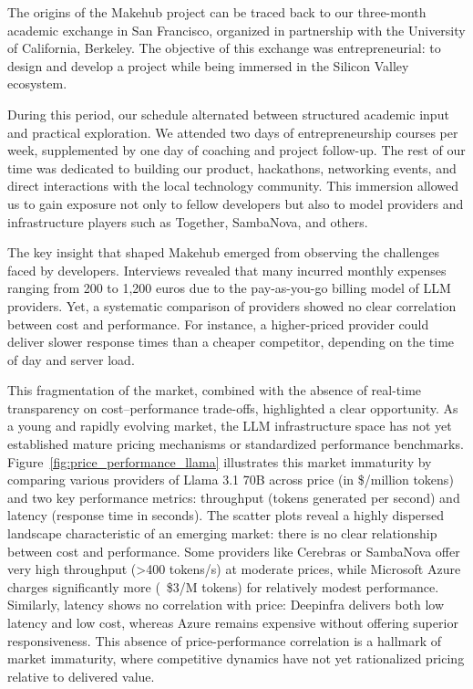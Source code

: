 \documentclass[english]{article}
\begin{document}
The origins of the Makehub project can be traced back to our three-month academic exchange in San Francisco, organized in partnership with the University of California, Berkeley. 
The objective of this exchange was entrepreneurial: to design and develop a project while being immersed in the Silicon Valley ecosystem.

During this period, our schedule alternated between structured academic input and practical exploration. 
We attended two days of entrepreneurship courses per week, supplemented by one day of coaching and project follow-up. 
The rest of our time was dedicated to building our product, hackathons, networking events, and direct interactions with the local technology community. 
This immersion allowed us to gain exposure not only to fellow developers but also to model providers and infrastructure players such as Together, SambaNova, and others.

The key insight that shaped Makehub emerged from observing the challenges faced by developers. 
Interviews revealed that many incurred monthly expenses ranging from 200 to 1,200 euros due to the pay-as-you-go billing model of LLM providers. 
Yet, a systematic comparison of providers showed no clear correlation between cost and performance. 
For instance, a higher-priced provider could deliver slower response times than a cheaper competitor, depending on the time of day and server load.

This fragmentation of the market, combined with the absence of real-time transparency on cost–performance trade-offs, highlighted a clear opportunity.
As a young and rapidly evolving market, the LLM infrastructure space has not yet established mature pricing mechanisms or standardized performance benchmarks.
Figure~\ref{fig:price_performance_llama} illustrates this market immaturity by comparing various providers of Llama 3.1 70B across price (in \$/million tokens) and two key performance metrics: throughput (tokens generated per second) and latency (response time in seconds).
The scatter plots reveal a highly dispersed landscape characteristic of an emerging market: there is no clear relationship between cost and performance.
Some providers like Cerebras or SambaNova offer very high throughput (>400 tokens/s) at moderate prices, while Microsoft Azure charges significantly more (~\$3/M tokens) for relatively modest performance.
Similarly, latency shows no correlation with price: Deepinfra delivers both low latency and low cost, whereas Azure remains expensive without offering superior responsiveness.
This absence of price-performance correlation is a hallmark of market immaturity, where competitive dynamics have not yet rationalized pricing relative to delivered value.
\end{document}
